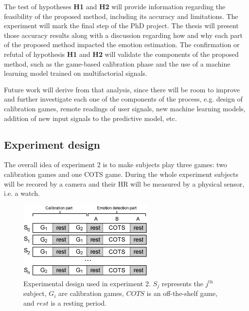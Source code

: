 The test of hypotheses \textbf{H1} and \textbf{H2} will provide information regarding the feasibility of the proposed method, including its accuracy and limitations. The experiment will mark the final step of the PhD project. The thesis will present those accuracy results along with a discussion regarding how and why each part of the proposed method impacted the emotion estimation. The confirmation or refutal of hypothesis \textbf{H1} and \textbf{H2} will validate the components of the proposed method, such as the game-based calibration phase and the use of a machine learning model trained on multifactorial signals.

Future work will derive from that analysis, since there will be room to improve and further investigate each one of the components of the process, e.g. design of calibration games, remote readings of user signals, new machine learning models, addition of new input signals to the predictive model, etc.

\subsection{Experiment design}

The overall idea of experiment 2 is to make subjects play three games: two calibration games and one COTS game. During the whole experiment subjects will be recored by a camera and their HR will be measured by a physical sensor, i.e. a watch.

\begin{figure}[ht]
   \centering
   \includegraphics[width=0.6\textwidth]{figures/closing-experiment2-design.png}
   \caption{Experimental design used in experiment 2. $S_j$ represents the $j^{\text{th}}$ subject, $G_i$ are calibration games, $COTS$ is an off-the-shelf game, and $rest$ is a resting period.}
   \label{fig:closing-experiment2-design}
\end{figure}

